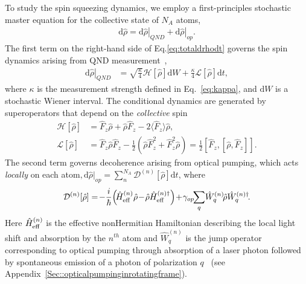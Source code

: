 \documentclass[aps,pra,twocolumn,superscriptaddress]{revtex4-1} %
\newcommand{\expect}[1]{\big\langle #1 \big\rangle}
\begin{document}
To study the spin squeezing dynamics, we employ a first-principles stochastic master equation for the collective state of $N_A$ atoms,
\begin{align}\label{eq:totaldrhodt}
\mathrm{d}\hat{\rho}= \left.\mathrm{d}\hat{\rho}\right|_{QND}+\left.\mathrm{d}\hat{\rho}\right|_{op}.
\end{align}
The first term on the right-hand side of Eq.\eqref{eq:totaldrhodt} governs the spin dynamics arising from QND measurement~\cite{Jacobs2006,Baragiola2014},
\begin{align}
\left.\mathrm{d}\hat{\rho}\right|_{QND} &= \sqrt{\frac{\kappa}{4}}\mathcal{H}\left[\hat{\rho} \right]\mathrm{d}W + \frac{\kappa}{4}\mathcal{L}\left[ \hat{\rho}\right]\mathrm{d}t,
\end{align}
where  $\kappa$ is the measurement strength defined in Eq.~\eqref{eq:kappa}, and $\mathrm{d}W$ is a stochastic Wiener interval. The conditional dynamics are generated by superoperators that depend on the {\em collective} spin
\begin{subequations}
\begin{align}
\mathcal{H}\left[ \hat{\rho}\right] &= \hat{F}_z \hat{\rho} + \hat{\rho}\hat{F}_z -2\expect{\hat{F}_z}\hat{\rho}, \\
\mathcal{L}\left[ \hat{\rho} \right] &= \hat{F}_z \hat{\rho}\hat{F}_z \!-\!\frac{1}{2}\!\left(\hat{\rho}\hat{F}_z^2\!+\!\hat{F}_z^2\hat{\rho} \right)\!=\!\frac{1}{2}\!\left[\hat{F}_z,\left[\hat{\rho},\hat{F}_z \right] \right].
\end{align}
\end{subequations}
The second term governs decoherence arising from optical pumping, which acts {\em locally} on each atom$,\mathrm{d}\hat{\rho}|_{op}=\sum_n^{N_A} \mathcal{D}^{(n)}\left[ \hat{\rho}\right] \mathrm{d}t$, where 
\begin{equation}
\mathcal{D}^{(n)}\!\left[ \hat{\rho}\right] = \!-\frac{i}{\hbar}\!\left(\!\hat{H}^{(n)}_{\rm eff}\hat{\rho} \!-\! \hat{\rho} \hat{H}^{(n)\dag}_{\rm eff}\right) \!+\! \gamma_{op}\!\! \sum_q\! \hat{W}^{(n)}_q\! \hat{\rho}\hat{W}^{(n)\dag}_q\!.
\label{op_superator}
\end{equation}
Here $\hat{H}^{(n)}_{\rm eff}$ is the effective nonHermitian Hamiltonian describing the local light shift and absorption by the $n^{th}$ atom and $\hat{W}^{(n)}_q$ is the jump operator corresponding to optical pumping through absorption of a laser photon followed by spontaneous emission of a photon of polarization $q$~\cite{Deutsch2010a} (see Appendix~\ref{Sec::opticalpumpinginrotatingframe}).   
\end{document}

